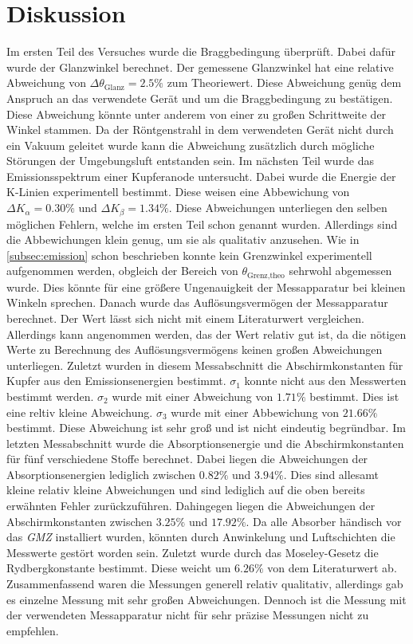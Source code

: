 \section{Diskussion}
\label{sec:Diskussion}
Im ersten Teil des Versuches wurde die Braggbedingung überprüft. Dabei dafür wurde der Glanzwinkel berechnet. Der gemessene Glanzwinkel hat eine relative Abweichung von 
$\Delta \theta_\text{Glanz} = 2.5\%$ zum Theoriewert. Diese Abweichung genüg dem Anspruch an das verwendete Gerät und um die Braggbedingung zu bestätigen. Diese Abweichung 
könnte unter anderem von einer zu großen Schrittweite der Winkel stammen. Da der Röntgenstrahl in dem verwendeten Gerät nicht durch ein Vakuum geleitet wurde kann die Abweichung
zusätzlich durch mögliche Störungen der Umgebungsluft entstanden sein.  
Im nächsten Teil wurde das Emissionsspektrum einer Kupferanode untersucht. Dabei wurde die Energie der K-Linien experimentell bestimmt. Diese weisen eine Abbewichung 
von $\Delta K_{\alpha} = 0.30\%$ und $\Delta K_{\beta} = 1.34\%$. Diese Abweichungen unterliegen den selben möglichen Fehlern, welche im ersten Teil schon genannt wurden.
Allerdings sind die Abbewichungen klein genug, um sie als qualitativ anzusehen.
Wie in \autoref{subsec:emission} schon beschrieben konnte kein Grenzwinkel experimentell aufgenommen werden, obgleich der Bereich von $\theta_{\text{Grenz,theo}}$
sehrwohl abgemessen wurde. Dies könnte für eine größere Ungenauigkeit der Messapparatur bei kleinen Winkeln sprechen. 
Danach wurde das Auflösungsvermögen der Messapparatur berechnet. Der Wert lässt sich nicht mit einem Literaturwert vergleichen. Allerdings kann angenommen werden, das der
Wert relativ gut ist, da die nötigen Werte zu Berechnung des Auflösungsvermögens keinen großen Abweichungen unterliegen. 
Zuletzt wurden in diesem Messabschnitt die Abschirmkonstanten für Kupfer aus den Emissionsenergien bestimmt. $\sigma_1$ konnte nicht aus den Messwerten bestimmt werden. 
$\sigma_2$ wurde mit einer Abweichung von $1.71\%$ bestimmt. Dies ist eine reltiv kleine Abweichung. $\sigma_3$ wurde mit einer Abbewichung von $21.66\%$ bestimmt. Diese 
Abweichung ist sehr groß und ist nicht eindeutig begründbar.
Im letzten Messabschnitt wurde die Absorptionsenergie und die Abschirmkonstanten für fünf verschiedene Stoffe berechnet. Dabei liegen die Abweichungen der 
Absorptionsenergien lediglich zwischen $0.82\%$ und $3.94\%$. Dies sind allesamt kleine relativ kleine Abweichungen und sind lediglich auf die oben bereits erwähnten Fehler 
zurückzuführen. Dahingegen liegen die Abweichungen der Abschirmkonstanten zwischen $3.25\%$ und $17.92\%$. Da alle Absorber händisch vor das \textit{GMZ} installiert wurden, 
könnten durch Anwinkelung und Luftschichten die Messwerte gestört worden sein. Zuletzt wurde durch das Moseley-Gesetz die Rydbergkonstante bestimmt. Diese weicht um 
$6.26\%$ von dem Literaturwert ab. 
Zusammenfassend waren die Messungen generell relativ qualitativ, allerdings gab es einzelne Messung mit sehr großen Abweichungen. Dennoch ist die Messung mit der verwendeten
Messapparatur nicht für sehr präzise Messungen nicht zu empfehlen.